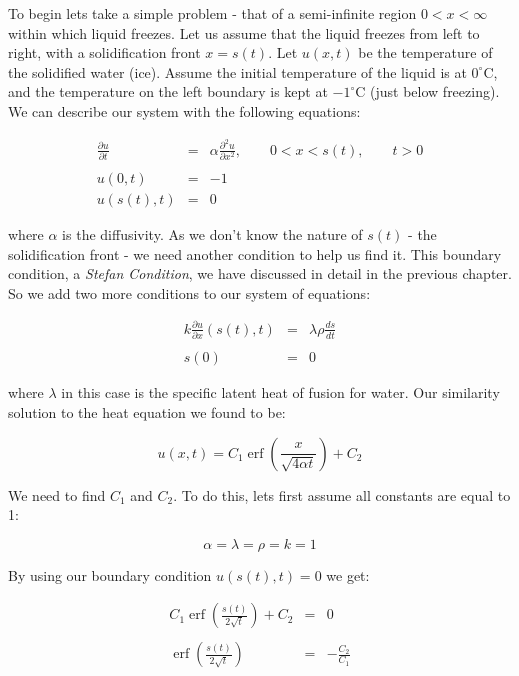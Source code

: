 \documentclass{report}
\DeclareMathOperator{\erf}{erf}
\begin{document}
To begin lets take a simple problem - that of a semi-infinite region $0 < x < \infty$ within which liquid 
freezes. Let us assume that the liquid freezes from left to right, with a solidification front $x = s(t)$. 
Let $u(x, t)$ be the temperature of the solidified water (ice). Assume the initial temperature of the 
liquid is at $0^{\circ}\mathrm{C}$, and the temperature on the left boundary is kept at 
$-1^{\circ}\mathrm{C}$ (just below freezing). We can describe our system with the following equations:\bigskip

\begin{eqnarray*} 
  \frac{\partial u}{\partial t} & = & \alpha \frac{\partial^2 u}{\partial x^2}, \qquad 0 < x < s(t), \qquad t > 0 \\\\
                        u(0, t) & = & -1 \\
                     u(s(t), t) & = & 0 
\end{eqnarray*}\medskip

where $\alpha$ is the diffusivity. As we don't know the nature of $s(t)$ - the solidification front - we 
need another condition to help us find it. This boundary condition, a \emph{Stefan Condition},  we have 
discussed in detail in the previous chapter. So we add two more conditions to our system of equations:\bigskip

\begin{eqnarray*} 
  k \frac{\partial u}{\partial x} (s(t), t) & = & \lambda \rho \frac{d s}{d t} \\\\
                                       s(0) & = & 0 
\end{eqnarray*}\medskip

where $\lambda$ in this case is the specific latent heat of fusion for water. Our similarity solution to 
the heat equation we found to be:\bigskip

\[ u(x, t) = C_1 \erf \left( \frac{x}{\sqrt{4 \alpha t}} \right) + C_2 \]\medskip

We need to find $C_1$ and $C_2$. To do this, lets first assume all constants are equal to 1:\bigskip

\[ \alpha = \lambda = \rho = k = 1 \]\medskip

By using our boundary condition $u(s(t), t) = 0$ we get:\bigskip

\begin{eqnarray*}
  C_1 \erf \left( \frac{s(t)}{2 \sqrt{t}} \right) + C_2 & = & 0 \\\\
            \erf \left( \frac{s(t)}{2 \sqrt{t}} \right) & = & - \frac{C_2}{C_1}
\end{eqnarray*}\medskip
\end{document}
